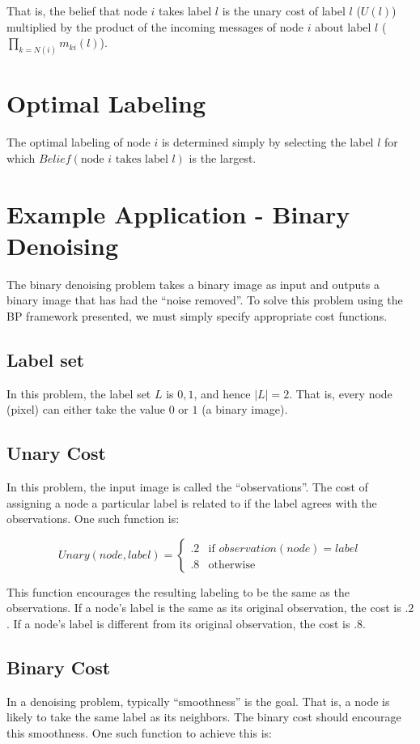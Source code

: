\documentclass[a4paper,10pt]{article}
\begin{document}
That is, the belief that node $i$ takes label $l$ is the unary cost of label $l$ ($U(l)$) multiplied by the product of the incoming messages of node $i$ about label $l$ ($\prod _{k = N(i)} m_{ki} (l)$).

\section{Optimal Labeling}
The optimal labeling of node $i$ is determined simply by selecting the label $l$ for which $Belief(\mbox{node } i \mbox{ takes label } l)$ is the largest.

\section{Example Application - Binary Denoising}
The binary denoising problem takes a binary image as input and outputs a binary image that has had the ``noise removed''. To solve this problem using the BP framework presented, we must simply specify appropriate cost functions.

\subsection{Label set}
In this problem, the label set $L$ is ${0,1}$, and hence $|L| = 2$. That is, every node (pixel) can either take the value $0$ or $1$ (a binary image).

\subsection{Unary Cost}
In this problem, the input image is called the ``observations''. The cost of assigning a node a particular label is related to if the label agrees with the observations. One such function is:

\begin{equation}
Unary(node, label) = 
\begin{cases} 
.2 & \text{if } observation(node) = label
\\
.8 & \text{otherwise }
\end{cases}
\end{equation}

This function encourages the resulting labeling to be the same as the observations.  If a node's label is the same as its original observation, the cost is $.2$. If a node's label is different from its original observation, the cost is $.8$.

\subsection{Binary Cost}
In a denoising problem, typically ``smoothness'' is the goal. That is, a node is likely to take the same label as its neighbors. The binary cost should encourage this  smoothness. One such function to achieve this is:
\end{document}
